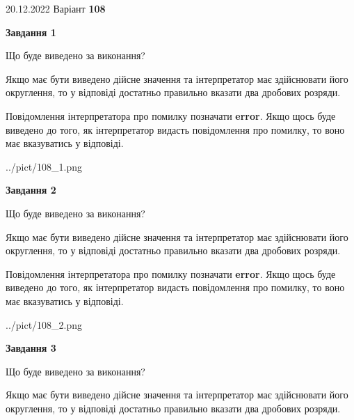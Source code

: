 \documentclass[12pt, ukrainian]{article}
\begin{document}
{20.12.2022 Варіант \No \textbf { 108 }\par}
{
\begin {Large}

{\begin {center}\textbf{Завдання 1}\end {center}}\par
Що буде виведено за виконання? \par

Якщо має бути виведено дійсне значення та інтерпретатор має здійснювати його округлення, 
то у відповіді достатньо правильно вказати два дробових розряди.

Повідомлення інтерпретатора про помилку позначати \textbf{error}.
Якщо щось буде виведено до того, як інтерпретатор видасть повідомлення про помилку, 
то воно має вказуватись у відповіді. \par

\begin{center}
	{../pict/108_1.png}
\end{center}
\newpage

{\begin {center}\textbf{Завдання 2}\end {center}}\par
Що буде виведено за виконання? \par

Якщо має бути виведено дійсне значення та інтерпретатор має здійснювати його округлення, 
то у відповіді достатньо правильно вказати два дробових розряди.

Повідомлення інтерпретатора про помилку позначати \textbf{error}.
Якщо щось буде виведено до того, як інтерпретатор видасть повідомлення про помилку, 
то воно має вказуватись у відповіді. \par

\begin{center}
	{../pict/108_2.png}
\end{center}
\newpage

{\begin {center}\textbf{Завдання 3}\end {center}}\par
Що буде виведено за виконання? \par

Якщо має бути виведено дійсне значення та інтерпретатор має здійснювати його округлення, 
то у відповіді достатньо правильно вказати два дробових розряди.


\end{Large}}
\end{document}
